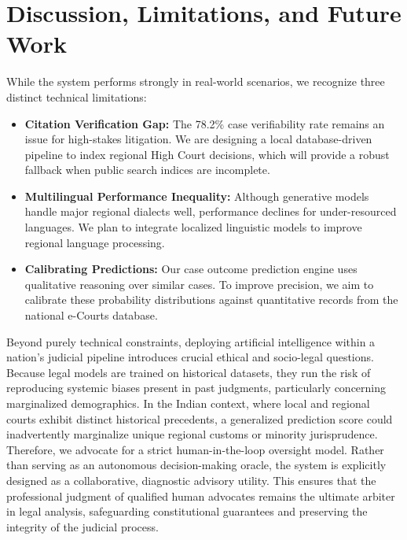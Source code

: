\documentclass[conference]{IEEEtran}
\begin{document}
\section{Discussion, Limitations, and Future Work}
\label{sec:limits}

While the system performs strongly in real-world scenarios, we recognize three distinct technical limitations:
\begin{itemize}[leftmargin=*]
  \item \textbf{Citation Verification Gap:} The 78.2\% case verifiability rate remains an issue for high-stakes litigation. We are designing a local database-driven pipeline to index regional High Court decisions, which will provide a robust fallback when public search indices are incomplete.
  \item \textbf{Multilingual Performance Inequality:} Although generative models handle major regional dialects well, performance declines for under-resourced languages. We plan to integrate localized linguistic models to improve regional language processing.
  \item \textbf{Calibrating Predictions:} Our case outcome prediction engine uses qualitative reasoning over similar cases. To improve precision, we aim to calibrate these probability distributions against quantitative records from the national e-Courts database.
\end{itemize}

Beyond purely technical constraints, deploying artificial intelligence within a nation's judicial pipeline introduces crucial ethical and socio-legal questions. Because legal models are trained on historical datasets, they run the risk of reproducing systemic biases present in past judgments, particularly concerning marginalized demographics. In the Indian context, where local and regional courts exhibit distinct historical precedents, a generalized prediction score could inadvertently marginalize unique regional customs or minority jurisprudence. Therefore, we advocate for a strict human-in-the-loop oversight model. Rather than serving as an autonomous decision-making oracle, the system is explicitly designed as a collaborative, diagnostic advisory utility. This ensures that the professional judgment of qualified human advocates remains the ultimate arbiter in legal analysis, safeguarding constitutional guarantees and preserving the integrity of the judicial process.
\end{document}
